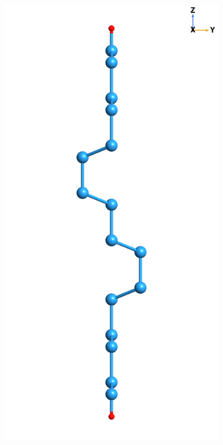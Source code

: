 \begin{figure}
\begin{minipage}[b]{0.31\textwidth}
        \label{fig:1x1front}
    \end{minipage}
    \begin{minipage}[b]{0.31\textwidth}
        \centering
        \includegraphics[width=\textwidth]{figures/source/structure/Si1x1-side}

\end{minipage}
\end{figure}
